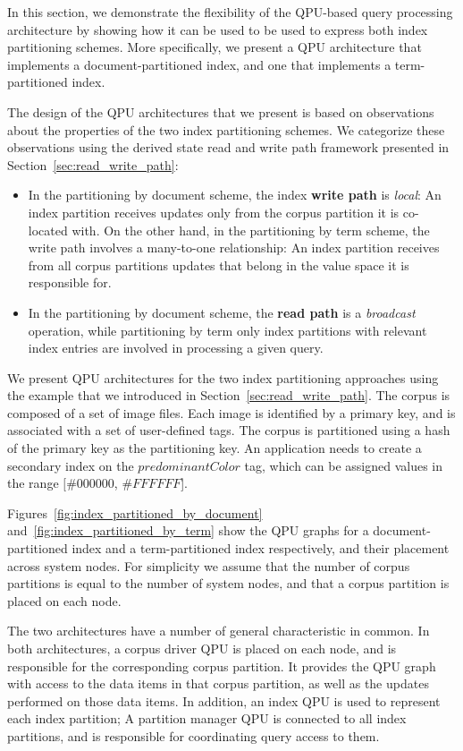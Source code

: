 In this section, we demonstrate the flexibility of the QPU-based query processing architecture by showing how it can be used to
be used to express both index partitioning schemes.
More specifically,
we present a QPU architecture that implements a document-partitioned index,
and one that implements a term-partitioned index.

The design of the QPU architectures that we present is based on observations about the properties of the two index partitioning schemes.
We categorize these observations using the derived state read and write path framework presented in
Section~\ref{sec:read_write_path}:
\begin{itemize}
  \item In the partitioning by document scheme,
  the index \textbf{write path} is \textit{local}:
  An index partition receives updates only from the corpus partition it is co-located with.
  On the other hand, in the partitioning by term scheme,
  the write path involves a many-to-one relationship:
  An index partition receives from all corpus partitions updates that belong in the value space it is responsible for.

  \item In the partitioning by document scheme,
  the \textbf{read path} is a \textit{broadcast} operation,
  while partitioning by term
  only index partitions with relevant index entries are involved in processing a given query.
\end{itemize}

We present QPU architectures for the two index partitioning approaches using the example that we introduced in Section~\ref{sec:read_write_path}.
The corpus is composed of a set of image files.
Each image is identified by a primary key, and is associated with a set of user-defined tags.
The corpus is partitioned using a hash of the primary key as the partitioning key.
An application needs to create a secondary index on the $predominantColor$ tag, which can be assigned values in the range $[\#000000$, $\#FFFFFF$].

Figures~\ref{fig:index_partitioned_by_document} and~\ref{fig:index_partitioned_by_term} show the QPU graphs for a
document-partitioned index and a term-partitioned index respectively, and their placement across system nodes.
For simplicity we assume that the number of corpus partitions is equal to the number of system nodes,
and that a corpus partition is placed on each node.

The two architectures have a number of general characteristic in common.
In both architectures, a corpus driver QPU is placed on each node,
and is responsible for the corresponding corpus partition.
It provides the QPU graph with access to the data items in that corpus partition,
as well as the updates performed on those data items.
In addition, an index QPU is used to represent each index partition;
A partition manager QPU is connected to all index partitions,
and is responsible for coordinating query access to them.

